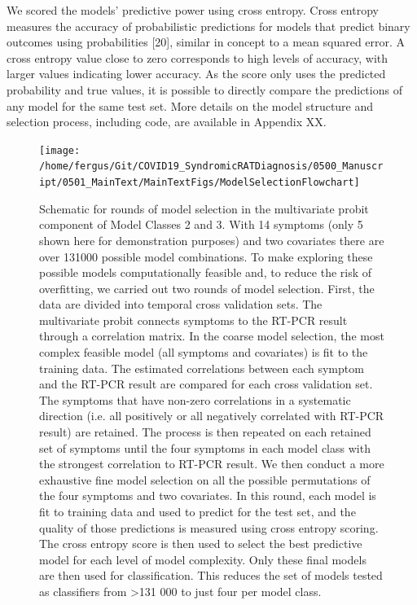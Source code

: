 \documentclass[]{elsarticle} %
\begin{document}
We scored the models' predictive power using cross entropy.
Cross entropy measures the accuracy of probabilistic predictions for models that predict binary outcomes using probabilities {[}20{]}, similar in concept to a mean squared error.
A cross entropy value close to zero corresponds to high levels of accuracy, with larger values indicating lower accuracy.
As the score only uses the predicted probability and true values, it is possible to directly compare the predictions of any model for the same test set.
More details on the model structure and selection process, including code, are available in Appendix XX.

\begin{figure}
\texttt{[image: /home/fergus/Git/COVID19\_SyndromicRATDiagnosis/0500\_Manuscript/0501\_MainText/MainTextFigs/ModelSelectionFlowchart]} \caption{Schematic for rounds of model selection in the multivariate probit component of Model Classes 2 and 3. With 14 symptoms (only 5 shown here for demonstration purposes) and two covariates there are over 131000 possible model combinations. To make exploring these possible models computationally feasible and, to reduce the risk of overfitting, we carried out two rounds of model selection. First, the data are divided into temporal cross validation sets. The multivariate probit connects symptoms to the RT-PCR result through a correlation matrix. In the coarse model selection, the most complex feasible model (all symptoms and covariates) is fit to the training data. The estimated correlations between each symptom and the RT-PCR result are compared for each cross validation set. The symptoms that have non-zero correlations in a systematic direction (i.e. all positively or all negatively correlated with RT-PCR result) are retained. The process is then repeated on each retained set of symptoms until the four symptoms in each model class with the strongest correlation to RT-PCR result. We then conduct a more exhaustive fine model selection on all the possible permutations of the four symptoms and two covariates. In this round, each model is fit to training data and used to predict for the test set, and the quality of those predictions is measured using cross entropy scoring. The cross entropy score is then used to select the best predictive model for each level of model complexity. Only these final models are then used for classification. This reduces the set of models tested as classifiers from >131 000 to just four per model class.}\label{fig:modsel-flowchart}
\end{figure}
\end{document}
